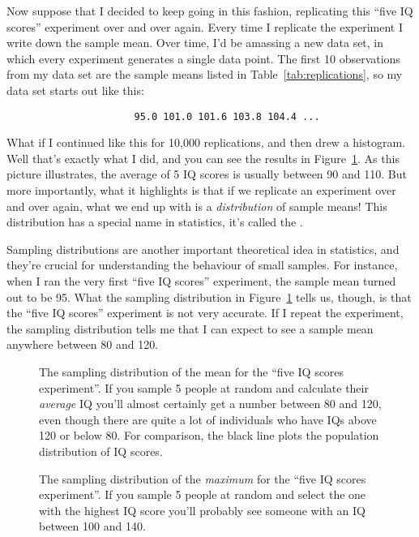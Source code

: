 Now suppose that I decided to keep going in this fashion, replicating this ``five IQ scores'' experiment over and over again. Every time I replicate the experiment I write down the sample mean. Over time, I'd be amassing a new data set, in which every experiment generates a single data point. The first 10 observations from my data set are the sample means listed in Table~\ref{tab:replications}, so my data set starts out like this:
\begin{verbatim}
                      95.0 101.0 101.6 103.8 104.4 ...
\end{verbatim}
What if I continued like this for 10,000 replications, and then drew a histogram. Well that's exactly what I did, and you can see the results in Figure~\ref{fig:sampdistmean}. As this picture illustrates, the average of 5 IQ scores is usually between 90 and 110. But more importantly, what it highlights is that if we replicate an experiment over and over again, what we end up with is a {\it distribution} of sample means! This distribution has a special name in statistics, it's called the . 

Sampling distributions are another important theoretical idea in statistics, and they're crucial for understanding the behaviour of small samples. For instance, when I ran the very first ``five IQ scores'' experiment, the sample mean turned out to be 95. What the sampling distribution in Figure~\ref{fig:sampdistmean} tells us, though, is that the ``five IQ scores'' experiment is not very accurate. If I repeat the experiment, the sampling distribution tells me that I can expect to see a sample mean anywhere between 80 and 120. 

\begin{figure}[!htb]
\begin{center}
\caption{The sampling distribution of the mean for the ``five IQ scores experiment''. If you sample 5 people at random and calculate their {\it average} IQ you'll almost certainly get a number between 80 and 120, even though there are quite a lot of individuals who have IQs above 120 or below 80. For comparison, the black line plots the population distribution of IQ scores.}
\label{fig:sampdistmean}
\end{center}
\end{figure}


\begin{figure}[!htb]
\begin{center}
\caption{The sampling distribution of the {\it maximum} for the ``five IQ scores experiment''. If you sample 5 people at random and select the one with the highest IQ score you'll probably see someone with an IQ between 100 and 140.}
\label{fig:sampdistmax}
\end{center}
\end{figure}


